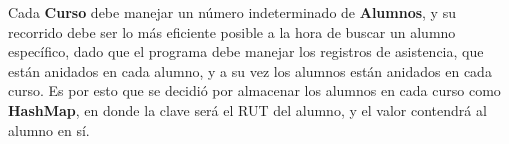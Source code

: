 Cada \textbf{Curso} debe manejar un número indeterminado de \textbf{Alumnos}, y su recorrido debe ser lo más eficiente posible a la hora de buscar un alumno específico, dado que el programa debe manejar los registros de asistencia, que están anidados en cada alumno, y a su vez los alumnos están anidados en cada curso. Es por esto que se decidió por almacenar los alumnos en cada curso como \textbf{HashMap}, en donde la clave será el RUT del alumno, y el valor contendrá al alumno en sí.

